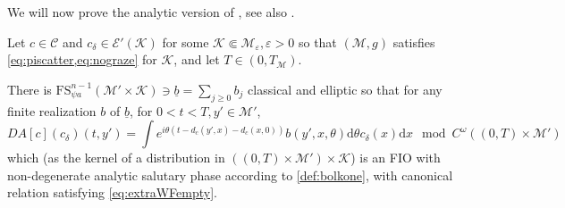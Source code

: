 \documentclass[
	fontsize=11pt, 
	twoside=false, 
	abstract=true, 
	a4paper,
]{scrartcl}
\newcommand{\eps}{\varepsilon}
\newcommand{\RR}{\mathbb{R}}
\newcommand{\dd}{\mathrm{d}}
\newcommand{\del}{\partial}
\newcommand{\ud}[1]{\underline{#1}}
\begin{document}

We will now prove the analytic version of \cite[Thm.~B]{zbMATH04097945}, see also \cite[Thm.~2.4]{zbMATH01725533}.
\begin{theorem}\label{thm:waveFIO}
	Let $c\in\mathcal{C}$ and $c_\delta \in \mathcal{E}'(\mathcal{K})$ for some $\mathcal{K}\Subset\mathcal{M}_\eps, \eps>0$ so that $(\mathcal{M},g)$ satisfies \cref{eq:piscatter,eq:nograze} for $\mathcal{K}$, and let $T \in (0,T_{\mathcal{M}})$.

	There is $\mathrm{FS}^{n-1}_{\psi a}(\mathcal{M}'\times \mathcal{K}) \ni \ud{b} = \sum_{j\geq 0} b_j$ classical and elliptic so that for any finite realization $b$ of $\ud{b}$, for $0<t<T, y' \in \mathcal{M}'$, 
	\begin{equation}\label{eq:fullcalcDA}
		DA[c](c_\delta)(t,y') = \int e^{i\theta(t-d_c(y',x)-d_c(x,0))}b(y',x,\theta)\dd\theta c_\delta(x)\dd x\mod C^\omega((0,T)\times \mathcal{M}')
	\end{equation}
	which (as the kernel of a distribution in $((0,T)\times\mathcal{M}')\times \mathcal{K}$) is an FIO with non-degenerate analytic salutary phase according to \cref{def:bolkone}, with canonical relation satisfying \cref{eq:extraWFempty}.%
\end{theorem}
\end{document}
